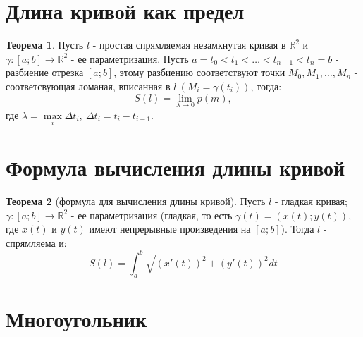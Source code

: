 \documentclass{report}
\theoremstyle{definition}
\newtheorem*{theorem}{Теорема}
\begin{document}
\section{Длина кривой как предел}

\begin{theorem}
    Пусть $l$ - простая спрямляемая незамкнутая кривая в $\mathbb{R}^2$ и $\gamma:[a;b]\rightarrow\mathbb{R}^2$
    - ее параметризация. Пусть $a = t_0 < t_1 < \ldots < t_{n-1} < t_n = b$ - разбиение отрезка $[a;b]$,
    этому разбиению соответствуют точки $M_0,M_1,\ldots,M_n$ - соответсвующая ломаная, вписанная в $l \
        (M_i = \gamma(t_i))$, тогда:
    \begin{equation*}
        S(l) = \underset{\lambda\rightarrow0}{\lim}p(m),
    \end{equation*}
    где $\lambda = \underset{i}{\max}\Delta t_i, \ \Delta t_i = t_i - t_{i-1}$.
\end{theorem}

\section{Формула вычисления длины кривой}

\begin{theorem}[формула для вычисления длины кривой]
    Пусть $l$ - гладкая кривая; $\gamma:[a;b]\rightarrow\mathbb{R}^2$ - ее параметризация (гладкая,
    то есть $\gamma(t) = (x(t);y(t))$, где $x(t)$ и $y(t)$ имеют непрерывные произведения на $[a;b]$).
    Тогда $l$ - спрямляема и:
    \begin{equation*}
        S(l) = \int_{a}^{b}\sqrt{(x'(t))^2 + (y'(t))^2}dt
    \end{equation*}
\end{theorem}

\section{Многоугольник}
\end{document}
